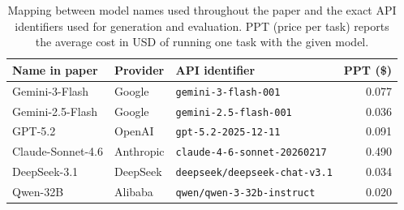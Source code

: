 \begin{table}[H]
\centering
\caption{Mapping between model names used throughout the paper and the exact API identifiers used for generation and evaluation. PPT (price per task) reports the average cost in USD of running one task with the given model.}
\label{tab:model-identifiers}
\small
\setlength{\tabcolsep}{6pt}
\vspace{2mm}
\begin{tabular}{@{}lllr@{}}
\toprule
Name in paper & Provider & API identifier & PPT (\$) \\
\midrule
Gemini-3-Flash    & Google     & \texttt{gemini-3-flash-001}        & 0.077 \\
Gemini-2.5-Flash  & Google     & \texttt{gemini-2.5-flash-001}      & 0.036 \\
GPT-5.2           & OpenAI     & \texttt{gpt-5.2-2025-12-11}        & 0.091 \\
Claude-Sonnet-4.6 & Anthropic  & \texttt{claude-4-6-sonnet-20260217} & 0.490 \\
DeepSeek-3.1      & DeepSeek   & \texttt{deepseek/deepseek-chat-v3.1} & 0.034 \\
Qwen-32B          & Alibaba    & \texttt{qwen/qwen-3-32b-instruct}  & 0.020 \\
\bottomrule
\end{tabular}
\end{table}
